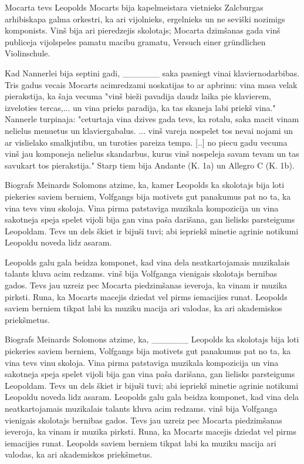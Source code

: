 \documentclass[a4paper]{article}
\begin{document}
Mocarta tevs Leopolds Mocarts bija kapelmeistara vietnieks Zalcburgas arhibiskapa galma orkestri, ka ari vijolnieks, ergelnieks un ne seviški nozimigs komponists. Vinš bija ari pieredzejis skolotajs; Mocarta dzimšanas gada vinš publiceja vijolspeles pamatu macibu gramatu, Versuch einer gründlichen Violinschule.

Kad Nannerlei bija septini gadi, \_\_\_\_\_\_ saka pasniegt vinai klaviernodarbibas. Tris gadus vecais Mocarts acimredzami noskatijas to ar apbrinu: vina masa velak pierakstija, ka šaja vecuma "vinš bieži pavadija daudz laika pie klavierem, izveloties tercas,... un vina prieks paradija, ka tas skaneja labi priekš vina." Nannerle turpinaja: "ceturtaja vina dzives gada tevs, ka rotalu, saka macit vinam nelielus menuetus un klaviergabalus. ... vinš vareja nospelet tos nevai nojami un ar vislielako smalkjutibu, un turoties pareiza tempa. [..] no piecu gadu vecuma vinš jau komponeja nelielus skandarbus, kurus vinš nospeleja savam tevam un tas savukart tos pierakstija." Starp tiem bija Andante (K. 1a) un Allegro C (K. 1b).

Biografs Meinards Solomons atzime, ka, kamer Leopolds ka skolotajs bija loti piekeries saviem berniem, Volfgangs bija motivets gut panakumus pat no ta, ka vina tevs vinu skoloja. Vina pirma patstaviga muzikala kompozicija un vina sakotneja speja spelet vijoli bija gan vina paša darišana, gan lielisks parsteigums Leopoldam. Tevs un dels škiet ir bijuši tuvi; abi iepriekš minetie agrinie notikumi Leopoldu noveda lidz asaram.

Leopolds galu gala beidza komponet, kad vina dela neatkartojamais muzikalais talants kluva acim redzams. vinš bija Volfganga vienigais skolotajs bernibas gados. Tevs jau uzreiz pec Mocarta piedzimšanas ieveroja, ka vinam ir muzika pirksti. Runa, ka Mocarts macejis dziedat vel pirms iemacijies runat. Leopolds saviem berniem tikpat labi ka muziku macija ari valodas, ka ari akademiskos priekšmetus.

Biografs Meinards Solomons atzime, ka, \_\_\_\_\_\_ Leopolds ka skolotajs bija loti piekeries saviem berniem, Volfgangs bija motivets gut panakumus pat no ta, ka vina tevs vinu skoloja. Vina pirma patstaviga muzikala kompozicija un vina sakotneja speja spelet vijoli bija gan vina paša darišana, gan lielisks parsteigums Leopoldam. Tevs un dels škiet ir bijuši tuvi; abi iepriekš minetie agrinie notikumi Leopoldu noveda lidz asaram.
Leopolds galu gala beidza komponet, kad vina dela neatkartojamais muzikalais talants kluva acim redzams. vinš bija Volfganga vienigais skolotajs bernibas gados. Tevs jau uzreiz pec Mocarta piedzimšanas ieveroja, ka vinam ir muzika pirksti. Runa, ka Mocarts macejis dziedat vel pirms iemacijies runat. Leopolds saviem berniem tikpat labi ka muziku macija ari valodas, ka ari akademiskos priekšmetus.
\end{document}
